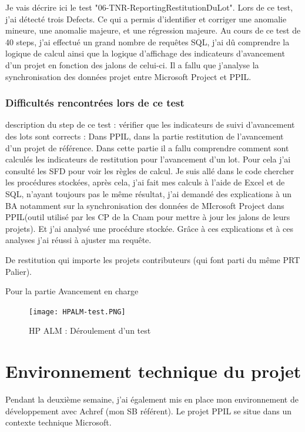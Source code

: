 Je vais décrire ici le test "06-TNR-ReportingRestitutionDuLot". Lors de ce test, j'ai détecté trois Defects. Ce qui a permis d'identifier et corriger une anomalie mineure, une anomalie majeure, et une régression majeure. Au cours de ce test de 40 steps, j'ai effectué un grand nombre de requêtes SQL, j'ai dû comprendre la logique de calcul ainsi que la logique d'affichage des indicateurs d'avancement d'un projet en fonction des jalons de celui-ci. Il a fallu que j'analyse la synchronisation des données projet entre Microsoft Project et PPIL.

\subsubsection{Difficultés rencontrées lors de ce test}

description du step de ce test : 
vérifier que les indicateurs de suivi d'avancement des lots sont corrects :
Dans PPIL, dans la partie restitution de l'avancement d'un projet de référence. Dans cette partie il a fallu comprendre comment sont calculés les indicateurs de restitution pour l'avancement d'un lot. Pour cela j'ai consulté les SFD pour voir les règles de calcul. Je suis allé dans le code chercher les procédures stockées, après cela, j'ai fait mes calculs à l'aide de Excel et de SQL, n'ayant toujours pas le même résultat, j'ai demandé des explications à un BA notamment sur la synchronisation des données de MIcrosoft Project dans PPIL(outil utilisé par les CP de la Cnam pour mettre à jour les jalons de leurs projets). Et j'ai analysé une procédure stockée. Grâce à ces explications et à ces analyses j'ai réussi à ajuster ma requête. 


De restitution qui importe les projets contributeurs (qui font parti du même PRT Palier).

Pour la partie Avancement en charge
\begin{figure}[h]
\centering
\texttt{[image: HPALM-test.PNG]}\\[1cm]
\caption{HP ALM : Déroulement d'un test}
\end{figure}

\section{Environnement technique du projet}

Pendant la deuxième semaine, j'ai également mis en place mon environnement de développement avec Achref (mon SB référent). Le projet PPIL se situe dans un contexte technique Microsoft. 

